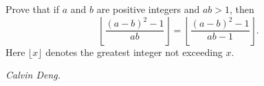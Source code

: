 Prove that if $a$ and $b$ are positive integers and $ab>1$, then
\[\left\lfloor\frac{(a-b)^2-1}{ab}\right\rfloor=\left\lfloor\frac{(a-b)^2-1}{ab-1}\right\rfloor.\]Here $\lfloor x\rfloor$ denotes the greatest integer not exceeding $x$.

\textit{Calvin Deng.}